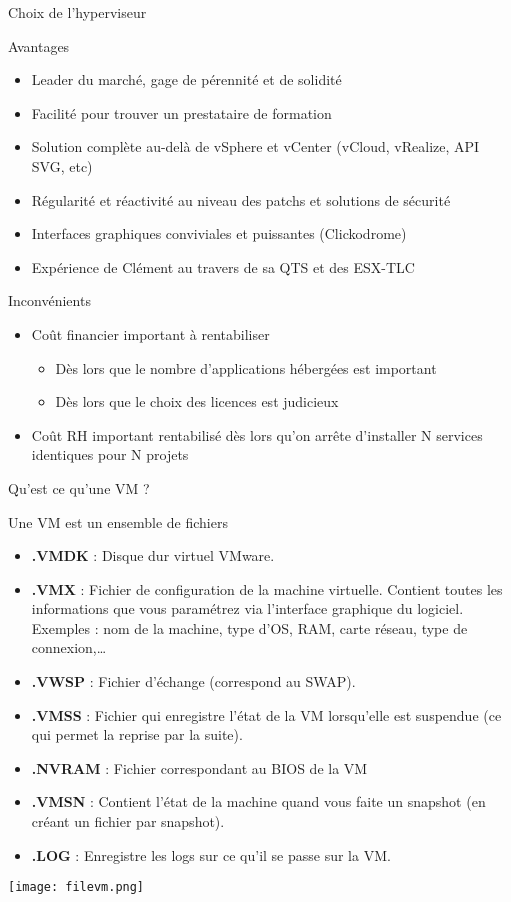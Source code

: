 \documentclass[10pt]{beamer}
\begin{document}
\begin{frame}{Choix de l'hyperviseur}
\begin{block}{Avantages}
\begin{itemize}
\item Leader du marché, gage de pérennité et de solidité
\item Facilité pour trouver un prestataire de formation
\item Solution complète au-delà de vSphere et vCenter (vCloud, vRealize, API SVG, etc)
\item Régularité et réactivité au niveau des patchs et solutions de sécurité
\item Interfaces graphiques conviviales et puissantes (Clickodrome)
\item Expérience de Clément au travers de sa QTS et des ESX-TLC
\end{itemize}
\end{block}
\begin{block}{Inconvénients}
\begin{itemize}
\item Coût financier important à rentabiliser
\begin{itemize}
    \item Dès lors que le nombre d’applications hébergées est important
\item Dès lors que le choix des licences est judicieux
\end{itemize}
\item Coût RH important rentabilisé dès lors qu’on arrête d’installer N services identiques pour N projets 
\end{itemize}
\end{block}
\end{frame}

\begin{frame}{Qu'est ce qu'une VM ?}
\begin{block}{Une VM est un ensemble de fichiers}
\begin{itemize}
\item \textbf{.VMDK} : Disque dur virtuel VMware.
\item \textbf{.VMX }: Fichier de configuration de la machine virtuelle. Contient toutes les informations que vous paramétrez via l’interface graphique du logiciel. Exemples : nom de la machine, type d’OS, RAM, carte réseau, type de connexion,…
\item \textbf{.VWSP} : Fichier d’échange (correspond au SWAP).
\item \textbf{.VMSS} : Fichier qui enregistre l’état de la VM lorsqu’elle est suspendue (ce qui permet la reprise par la suite).
\item \textbf{.NVRAM} : Fichier correspondant au BIOS de la VM  
\item \textbf{.VMSN} : Contient l'état de la machine quand vous faite un snapshot (en créant un fichier par snapshot).
\item \textbf{.LOG} : Enregistre les logs sur ce qu'il se passe sur la VM. 
\end{itemize}
\end{block} 
\end{frame}

\begin{center}
\texttt{[image: filevm.png]}   
\end{center}
\end{document}
